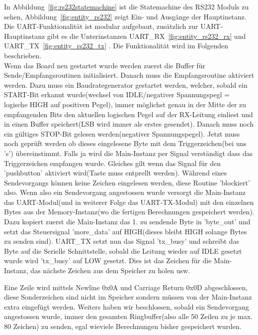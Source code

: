 In Abbildung~\ref{fig:rs232statemachine} ist die Statemachine des RS232 Moduls zu sehen, Abbildung~\ref{fig:entity_rs232} zeigt Ein- und Ausgänge der Hauptinstanz. Die UART-Funktionalität ist modular aufgebaut, zusätzlich zur UART-Hauptinstanz gibt es die Unterinstanzen UART\_RX~\ref{fig:entity_rs232_rx} und UART\_TX~\ref{fig:entity_rs232_tx} . Die Funktionalität wird im Folgenden beschrieben. \\
Wenn das Board neu gestartet wurde werden zuerst die Buffer für Sende/Empfangsroutinen initialisiert. Danach muss die Empfangsroutine aktiviert werden. Dazu muss ein Baudrategenerator gestartet werden, welcher, sobald ein START-Bit erkannt wurde(wechsel von IDLE/negativer Spannungspegl = logische HIGH auf positiven Pegel), immer möglichst genau in der Mitte der zu empfangenden Bits den aktuellen logischen Pegel auf der RX-Leitung  einliest und in einen Buffer speichert(LSB wird immer als erstes gesendet). Danach muss noch ein gültiges STOP-Bit gelesen werden(negativer Spannungspegel). Jetzt muss noch geprüft werden ob dieses eingelesene Byte mit dem Triggerzeichen(bei uns 's') übereinstimmt. Falls ja wird die Main-Instanz per Signal verständigt dass das Triggerzeichen empfangen wurde. Gleiches gilt wenn das Signal für den 'pushbutton' aktiviert wird(Taste muss entprellt werden). Während eines Sendevorgangs können keine Zeichen eingelesen werden, diese Routine 'blockiert' also.
Wenn also ein Sendevorgang angestossen wurde versorgt die Main-Instanz das UART-Modul(und in weiterer Folge das UART-TX-Modul) mit den einzelnen Bytes aus der Memory-Instanz(wo die fertigen Berechnungen gespeichert werden). Dazu kopiert zuerst die Main-Instanz das 1. zu sendende Byte in 'byte\_out' und setzt das Steuersignal 'more\_data' auf HIGH(dieses bleibt HIGH solange Bytes zu senden sind). UART\_TX setzt nun das Signal 'tx\_busy' und schreibt das Byte auf die Serielle Schnittstelle, sobald die Leitung wieder auf IDLE gesetzt wurde wird 'tx\_busy' auf LOW gesetzt. Dies ist das Zeichen für die Main-Instanz, das nächste Zeichen aus dem Speicher zu holen usw.  


Eine Zeile wird mittels Newline 0x0A und Carriage Return 0x0D abgeschlossen, diese Sonderzeichen sind nicht im Speicher sondern müssen von der Main-Instanz extra eingefügt werden. Weiters haben wir beschlossen, sobald ein Sendevorgang angestossen wurde, immer den gesamten Ringbuffer(also alle 50 Zeilen zu je max. 80 Zeichen) zu senden, egal wieviele Berechnungen bisher gespeichert wurden.

